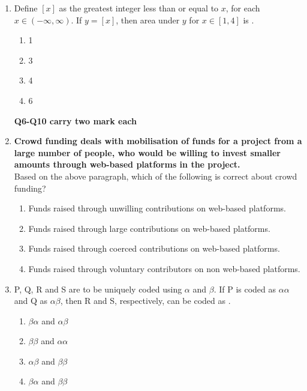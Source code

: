 \documentclass[journal,12pt,onecolumn]{IEEEtran}
\theoremstyle{remark}
\begin{document}
\begin{enumerate}
    \item Define $[x]$ as the greatest integer less than or equal to $x$, for each $x \in (-\infty, \infty)$. If $y = [x]$, then area under $y$ for $x \in [1,4]$ is \underline{\hspace{1cm}}.
    
    \begin{enumerate}
        \item 1
        \item 3
        \item 4
        \item 6
    \end{enumerate}
    

    \textbf{Q6-Q10 carry two mark each}
    \item \textbf{Crowd funding deals with mobilisation of funds for a project from a large number of people, who would be willing to invest smaller amounts through web-based platforms in the project.}\\
    Based on the above paragraph, which of the following is correct about crowd funding?
    
    \begin{enumerate}
        \item Funds raised through unwilling contributions on web-based platforms.
        \item Funds raised through large contributions on web-based platforms.
        \item Funds raised through coerced contributions on web-based platforms.
        \item Funds raised through voluntary contributors on non web-based platforms.
    \end{enumerate}
    \item P, Q, R and S are to be uniquely coded using $\alpha$ and $\beta$. If P is coded as $\alpha\alpha$ and Q as $\alpha\beta$, then R and S, respectively, can be coded as \underline{\hspace{2cm}}.
    
    \begin{enumerate}
        \item $\beta\alpha$ and $\alpha\beta$
        \item $\beta\beta$ and $\alpha\alpha$
        \item $\alpha\beta$ and $\beta\beta$
        \item $\beta\alpha$ and $\beta\beta$
    \end{enumerate}
    

\end{enumerate}
\end{document}

